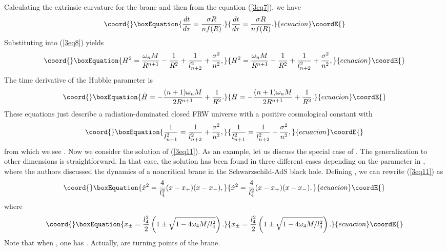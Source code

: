 \documentclass[a4paper,12pt]{article}
\begin{document}
Calculating the extrinsic curvature for the brane and then from the
equation (\ref{3eq7}), we have
\begin{equation}\coord{}\boxEquation{
\label{3eq10}
 \frac{dt}{d\tau}= \frac{\sigma R}{nf(R)}.
}{
\frac{dt}{d\tau}= \frac{\sigma R}{nf(R)}.
}{ecuacion}\coordE{}\end{equation}
Substituting into (\ref{3eq8}) yields
\begin{equation}\coord{}\boxEquation{
\label{3eq11}
H^2 = \frac{\omega_n M}{R^{n+1}}
 -\frac{1}{R^2}+\frac{1}{l_{n+2}^2} +\frac{\sigma^2}{n^2},
 }{
H^2 = \frac{\omega_n M}{R^{n+1}}
 -\frac{1}{R^2}+\frac{1}{l_{n+2}^2} +\frac{\sigma^2}{n^2},
 }{ecuacion}\coordE{}\end{equation}
 The time derivative of the Hubble parameter is
 \begin{equation}\coord{}\boxEquation{
 \label{3eq12}
\dot H =-\frac{(n+1)\omega_n M}{2R^{n+1}} +\frac{1}{R^2}.
}{
 \dot H =-\frac{(n+1)\omega_n M}{2R^{n+1}} +\frac{1}{R^2}.
}{ecuacion}\coordE{}\end{equation}
These equations just describe a radiation-dominated closed FRW
universe with a positive cosmological constant \coordHE{} with
\begin{equation}\coord{}\boxEquation{
 \label{3eq13}
 \frac{1}{l_{n+1}^2}=
    \frac{1}{l_{n+2}^2} +
       \frac{\sigma^2}{n^2},
 }{
 \frac{1}{l_{n+1}^2}=
    \frac{1}{l_{n+2}^2} +
       \frac{\sigma^2}{n^2},
 }{ecuacion}\coordE{}\end{equation}
 from which we see \coordHE{}. Now we consider the solution
  of (\ref{3eq11}). As an example, let us discuss the special case of  
\coordHE{}. The generalization to other dimensions is straightforward. In that 
case, the solution has been found in three different cases depending 
on the parameter \coordHE{} in
 \cite{PS}, where the authors discussed the dynamics of  a noncritical
 brane in the Schwarzschild-AdS black hole. Defining \coordHE{}, we
 can rewrite (\ref{3eq11}) as
 \begin{equation}\coord{}\boxEquation{
 \label{3eq14}
 \dot x^2 =\frac{4}{l_4^2}(x-x_+)(x-x_-),
 }{
 \dot x^2 =\frac{4}{l_4^2}(x-x_+)(x-x_-),
 }{ecuacion}\coordE{}\end{equation}
where
\begin{equation}\coord{}\boxEquation{
x_{\pm} =\frac{l^2_4}{2}\left(1 \pm
\sqrt{1-4\omega_4M/l_4^2}\right).
}{
x_{\pm} =\frac{l^2_4}{2}\left(1 \pm
\sqrt{1-4\omega_4M/l_4^2}\right).
}{ecuacion}\coordE{}\end{equation}
Note that when \coordHE{}, one has \coordHE{}. Actually, \coordHE{} are turning 
points of the brane.
\end{document}
